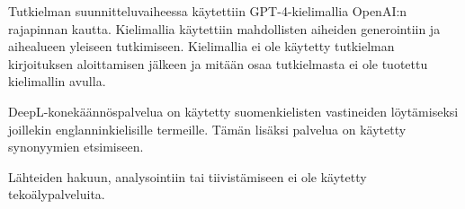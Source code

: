 
Tutkielman suunnitteluvaiheessa käytettiin GPT-4-kielimallia OpenAI:n rajapinnan kautta.
Kielimallia käytettiin mahdollisten aiheiden generointiin ja aihealueen yleiseen tutkimiseen.
Kielimallia ei ole käytetty tutkielman kirjoituksen aloittamisen jälkeen ja mitään osaa tutkielmasta ei ole tuotettu kielimallin avulla.

DeepL-konekäännöspalvelua on käytetty suomenkielisten vastineiden löytämiseksi joillekin englanninkielisille termeille.
Tämän lisäksi palvelua on käytetty synonyymien etsimiseen.

Lähteiden hakuun, analysointiin tai tiivistämiseen ei ole käytetty tekoälypalveluita.
